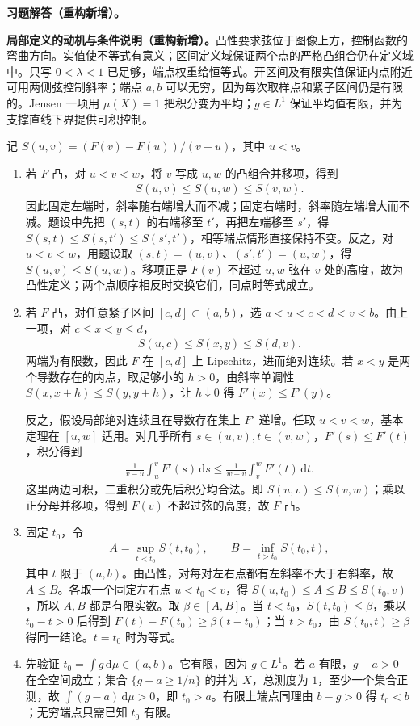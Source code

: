 \documentclass[../../main.tex]{subfiles}%
\begin{document}
\begin{solution}
\label{solution:ch03-convex-jensen}
\textbf{习题解答（重构新增）。}\begin{remark}
\textbf{局部定义的动机与条件说明（重构新增）。}凸性要求弦位于图像上方，控制函数的弯曲方向。实值使不等式有意义；区间定义域保证两个点的严格凸组合仍在定义域中。只写 $0<\lambda<1$ 已足够，端点权重给恒等式。开区间及有限实值保证内点附近可用两侧弦控制斜率；端点 $a,b$ 可以无穷，因为每次取样点和紧子区间仍是有限的。Jensen 一项用 $\mu(X)=1$ 把积分变为平均；$g\in L^1$ 保证平均值有限，并为支撑直线下界提供可积控制。
\end{remark}
记 $S(u,v)=(F(v)-F(u))/(v-u)$，其中 $u<v$。
\begin{enumerate}
\item 若 $F$ 凸，对 $u<v<w$，将 $v$ 写成 $u,w$ 的凸组合并移项，得到
\begin{align*}
S(u,v)\le S(u,w)\le S(v,w).
\end{align*}
因此固定左端时，斜率随右端增大而不减；固定右端时，斜率随左端增大而不减。题设中先把 $(s,t)$ 的右端移至 $t'$，再把左端移至 $s'$，得 $S(s,t)\le S(s,t')\le S(s',t')$，相等端点情形直接保持不变。反之，对 $u<v<w$，用题设取 $(s,t)=(u,v)$、$(s',t')=(u,w)$，得 $S(u,v)\le S(u,w)$。移项正是 $F(v)$ 不超过 $u,w$ 弦在 $v$ 处的高度，故为凸性定义；两个点顺序相反时交换它们，同点时等式成立。
\item 若 $F$ 凸，对任意紧子区间 $[c,d]\subset(a,b)$，选 $a<u<c<d<v<b$。由上一项，对 $c\le x<y\le d$，
\begin{align*}
S(u,c)\le S(x,y)\le S(d,v).
\end{align*}
两端为有限数，因此 $F$ 在 $[c,d]$ 上 Lipschitz，进而绝对连续。若 $x<y$ 是两个导数存在的内点，取足够小的 $h>0$，由斜率单调性 $S(x,x+h)\le S(y,y+h)$，让 $h\downarrow0$ 得 $F'(x)\le F'(y)$。

反之，假设局部绝对连续且在导数存在集上 $F'$ 递增。任取 $u<v<w$，基本定理在 $[u,w]$ 适用。对几乎所有 $s\in(u,v),t\in(v,w)$，$F'(s)\le F'(t)$，积分得到
\begin{align*}
\frac1{v-u}\int_u^vF'(s)\,\mathrm ds
\le\frac1{w-v}\int_v^wF'(t)\,\mathrm dt.
\end{align*}
这里两边可积，二重积分或先后积分均合法。即 $S(u,v)\le S(v,w)$；乘以正分母并移项，得到 $F(v)$ 不超过弦的高度，故 $F$ 凸。
\item 固定 $t_0$，令
\begin{align*}
A=\sup_{t<t_0}S(t,t_0),\qquad B=\inf_{t>t_0}S(t_0,t),
\end{align*}
其中 $t$ 限于 $(a,b)$。由凸性，对每对左右点都有左斜率不大于右斜率，故 $A\le B$。各取一个固定左右点 $u<t_0<v$，得
$S(u,t_0)\le A\le B\le S(t_0,v)$，所以 $A,B$ 都是有限实数。取 $\beta\in[A,B]$。当 $t<t_0$，$S(t,t_0)\le\beta$，乘以 $t_0-t>0$ 后得到 $F(t)-F(t_0)\ge\beta(t-t_0)$；当 $t>t_0$，由 $S(t_0,t)\ge\beta$ 得同一结论。$t=t_0$ 时为等式。
\item 先验证 $t_0=\int g\,\mathrm d\mu\in(a,b)$。它有限，因为 $g\in L^1$。若 $a$ 有限，$g-a>0$ 在全空间成立；集合 $\{g-a\ge1/n\}$ 的并为 $X$，总测度为 $1$，至少一个集合正测，故 $\int(g-a)\,\mathrm d\mu>0$，即 $t_0>a$。有限上端点同理由 $b-g>0$ 得 $t_0<b$；无穷端点只需已知 $t_0$ 有限。


\end{enumerate}
\end{solution}
\end{document}
